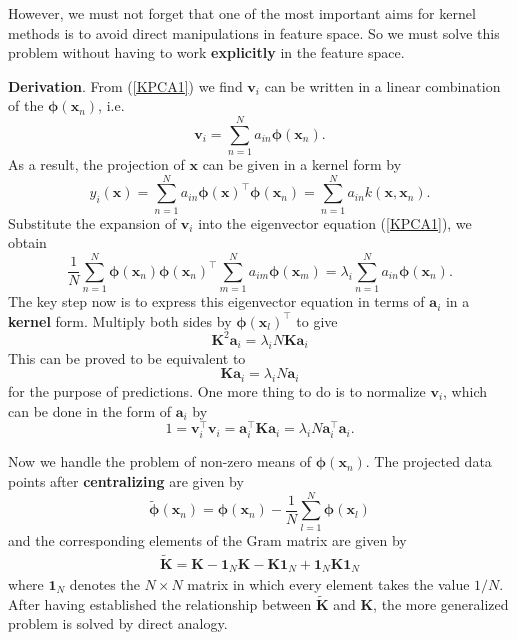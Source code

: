 \documentclass[a4paper]{book}
\renewcommand{\bf}{\mathbf}
\newcommand{\bs}{\boldsymbol}
\begin{document}
However, we must not forget that one of the most important aims for kernel methods is to avoid direct manipulations in feature space. So we must solve this problem without having to work \textbf{explicitly} in the feature space.

\textbf{Derivation}.  From (\ref{KPCA1}) we find $\bf{v}_i$ can be written in a linear combination of the $\bs{\phi}(\bf{x}_n)$, i.e.
\begin{equation}
	\bf{v}_i = \sum_{n=1}^N a_{in}\bs{\phi}(\bf{x}_n).
\end{equation}
As a result, the projection of $\bf{x}$ can be given in a kernel form by
\begin{equation}
	y_i(\bf{x}) = \sum_{n=1}^N a_{in}\bs{\phi}(\bf{x})^{\intercal} \bs{\phi}(\bf{x}_n) = \sum_{n=1}^N a_{in} k(\bf{x},\bf{x}_n).
\end{equation}
Substitute the expansion of $\bf{v}_i$ into the eigenvector equation (\ref{KPCA1}), we obtain
\begin{equation}
	\frac{1}{N} \sum_{n=1}^N \bs{\phi}(\bf{x}_n)\bs{\phi}(\bf{x}_n)^{\intercal} \sum_{m=1}^N a_{im} \bs{\phi}(\bf{x}_m)=\lambda_i\sum_{n=1}^N a_{in}\bs{\phi}(\bf{x}_n).
\end{equation}
The key step now is to express this eigenvector equation in terms of $\bf{a}_i$ in a \textbf{kernel} form. Multiply both sides by $\bs{\phi}(\bf{x}_l)^{\intercal}$ to give
\begin{equation}
	\bf{K}^2 \bf{a}_i = \lambda_i N \bf{Ka}_i
\end{equation}
This can be proved to be equivalent to
\begin{equation}
	\bf{Ka}_i = \lambda_i N \bf{a}_i
\end{equation}
for the purpose of predictions. One more thing to do is to normalize $\bf{v}_i$, which can be done in the form of $\bf{a}_i$ by
\begin{equation}
	1 = \bf{v}_i^{\intercal} \bf{v}_i = \bf{a}_i^{\intercal} \bf{Ka}_i = \lambda_i N \bf{a}_i^{\intercal}\bf{a}_i.
\end{equation}

Now we handle the problem of non-zero means of $\bs{\phi}(\bf{x}_n)$. The projected data points after \textbf{centralizing} are given by
\begin{equation}
	\tilde{\bs{\phi}}(\bf{x}_n) = \bs{\phi}(\bf{x}_n) - \frac{1}{N} \sum_{l=1}^N \bs{\phi}(\bf{x}_l)
\end{equation}
and the corresponding elements of the Gram matrix are given by
\begin{align}
	\tilde{\bf{K}} = \bf{K} - \bf{1}_N\bf{K} - \bf{K} \bf{1}_N + \bf{1}_N \bf{K} \bf{1}_N
\end{align}
where $\bf{1}_N$ denotes the $N \times N$ matrix in which every element takes the value $1/N$. After having established the relationship between $\tilde{\bf{K}}$ and $\bf{K}$, the more generalized problem is solved by direct analogy.
\end{document}
